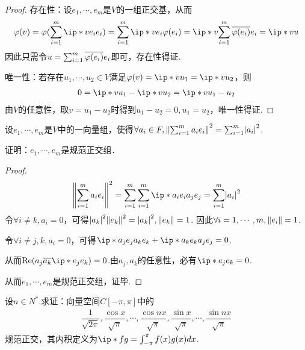 \begin{proof}
    存在性：设\(e_1,\cdots,e_m\)是\(V\)的一组正交基，从而
    \begin{align*}
        \varphi(v)=\varphi(\sum_{i=1}^m \ip*{v}{e_i}e_i)=\sum_{i=1}^m \ip*{v}{e_i}\varphi(e_i)
        =\ip*{v}{\sum_{i=1}^m \ol{\varphi(e_i)}e_i}=\ip*{v}{u}
    \end{align*}
    因此只需令\(u=\sum_{i=1}^m \ol{\varphi(e_i)}e_i\)即可，存在性得证.

    唯一性：若存在\(u_1,\cdots,u_2 \in V\)满足\(\varphi(v)=\ip*{v}{u_1}=\ip*{v}{u_2}\)，则
    \begin{align*}
        0=\ip*{v}{u_1}-\ip*{v}{u_2}=\ip*{v}{u_1-u_2}
    \end{align*}
    由\(V\)的任意性，取\(v=u_1-u_2\)时得到\(u_1-u_2=0,u_1=u_2\)，唯一性得证.
\end{proof}

\newpage

\begin{problem}[1]\label{6.B.1}
    设\(e_1,\cdots,e_m\)是\(V\)中的一向量组，使得\(\forall a_i \in F,\norm*{\sum_{i=1}^m a_ie_i}^2=\sum_{i=1}^m \abs*{a_i}^2\).

    证明：\(e_1,\cdots,e_m\)是规范正交组．
\end{problem}

\begin{proof}
    \begin{align*}
        \norm*{\sum_{i=1}^m a_ie_i}^2=\sum_{i=1}^m \sum_{i=1}^m \ip*{a_ie_i}{a_je_j}=\sum_{i=1}^m \abs*{a_i}^2
    \end{align*}
    令\(\forall i \ne k,a_i=0\)，可得\(\abs*{a_{k}}^2\norm*{e_{k}}^2=\abs*{a_{k}}^2,\norm*{e_{k}}=1\).
    因此\(\forall i=1,\cdots,m,\norm*{e_i}=1\).

    令\(\forall i \ne j,k,a_i=0\)，可得\(\ip*{a_je_j}{a_ke_k}+\ip*{a_ke_k}{a_je_j}=0\).

    从而\(\mathrm{Re}(a_j\ol{a_k}\ip*{e_j}{e_k})=0\).由\(a_j,a_k\)的任意性，必有\(\ip*{e_j}{e_k}=0\).

    从而\(e_1,\cdots,e_m\)是规范正交组，证毕.
\end{proof}

\begin{problem}[4]\label{6.B.4}
    设\(n \in N^*\).求证：向量空间\(C[-\pi,\pi]\)中的
    \begin{align*}
        \dfrac{1}{\sqrt{2\pi}},\dfrac{\cos x}{\sqrt{\pi}},\cdots,\dfrac{\cos nx}{\sqrt{\pi}},
        \dfrac{\sin x}{\sqrt{\pi}},\cdots,\dfrac{\sin nx}{\sqrt{\pi}}
    \end{align*}
    规范正交，其内积定义为\(\ip*{f}{g}=\int_{-\pi}^{\pi}f(x)g(x)dx\).
\end{problem}

